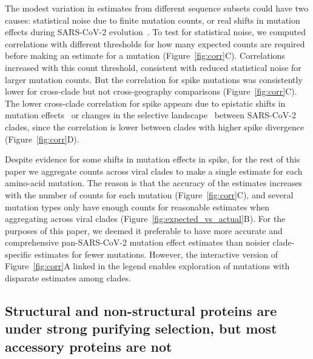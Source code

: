 \documentclass[9pt,twocolumn,twoside]{gsajnl_modified}
\begin{document}
The modest variation in estimates from different sequence subsets could have two causes: statistical noise due to finite mutation counts, or real shifts in mutation effects during SARS-CoV-2 evolution~\citep{starr2022shifting,moulana2022compensatory}.
To test for statistical noise, we computed correlations with different thresholds for how many expected counts are required before making an estimate for a mutation (Figure~\ref{fig:corr}C).
Correlations increased with this count threshold, consistent with reduced statistical noise for larger mutation counts.
But the correlation for spike mutations was consistently lower for cross-clade but not cross-geography comparisons (Figure~\ref{fig:corr}C).
The lower cross-clade correlation for spike appears due to epistatic shifts in mutation effects~\citep{starr2022shifting, moulana2022compensatory, pollock2012amino, shah2015contingency} or changes in the selective landscape~\citep{sun2023rapidly} between SARS-CoV-2 clades, since the correlation is lower between clades with higher spike divergence (Figure~\ref{fig:corr}D).

Despite evidence for some shifts in mutation effects in spike, for the rest of this paper we aggregate counts across viral clades to make a single estimate for each amino-acid mutation.
The reason is that the accuracy of the estimates increases with the number of counts for each mutation (Figure~\ref{fig:corr}C), and several mutation types only have enough counts for reasonable estimates when aggregating across viral clades (Figure~\ref{fig:expected_vs_actual}B).
For the purposes of this paper, we deemed it preferable to have more accurate and comprehensive pan-SARS-CoV-2 mutation effect estimates than noisier clade-specific estimates for fewer mutations.
However, the interactive version of Figure~\ref{fig:corr}A linked in the legend enables exploration of mutations with disparate estimates among clades.

\subsection*{Structural and non-structural proteins are under strong purifying selection, but most accessory proteins are not}
\end{document}
